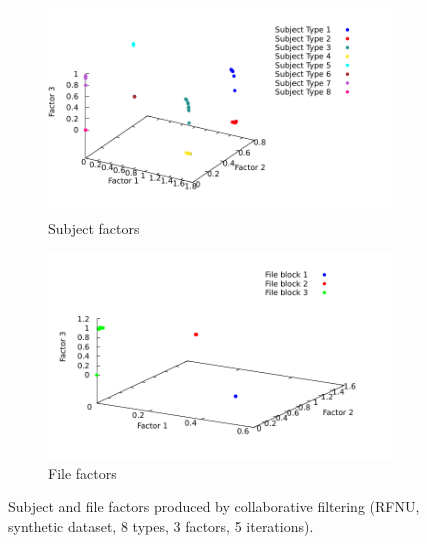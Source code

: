 \documentclass[10pt, conference, compsocconf]{IEEEtran}
\begin{document}
\begin{figure}
\begin{subfigure}{0.5\columnwidth}
\includegraphics[width=\columnwidth]{./data/results/latent-factors/5i-3f-ALS-r1-08-userFactors.pdf}
\caption{Subject factors}
\end{subfigure}
\hfill
\begin{subfigure}{0.5\columnwidth}
\includegraphics[width=\columnwidth]{./data/results/latent-factors/5i-3f-ALS-r1-08-itemFactors.pdf}
\caption{File factors}
\end{subfigure}
\caption{Subject and file factors produced by collaborative filtering (RFNU, synthetic dataset, 8 types, 3 factors, 5 iterations).}
\label{fig:factors3d}
\end{figure}
\end{document}
